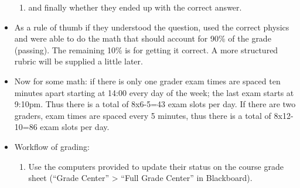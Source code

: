 \documentclass[12pt]{article}
\begin{document}
\begin{itemize}
\begin{enumerate}
			\item and finally whether they ended up with the correct answer.
		\end{enumerate}
	\item As a rule of thumb if they understood the question, used the correct physics and were able to do the math that should account for 90\% of the grade (passing). The remaining 10\% is for getting it correct. A more structured rubric will be supplied a little later.
	\item Now for some math: if there is only one grader exam times are spaced ten minutes apart starting at 14:00 every day of the week; the last exam starts at 9:10pm. Thus there is a total of 8x6-5=43 exam slots per day. If there are two graders, exam times are spaced every 5 minutes, thus there is a total of 8x12-10=86 exam slots per day.
	\item Workflow of grading:
\setlength{\headheight}{15pt}
		\begin{enumerate}
			\item Use the computers provided to update their status on the course grade sheet (``Grade Center'' > ``Full Grade Center'' in Blackboard).


\end{enumerate}
\end{itemize}
\end{document}
